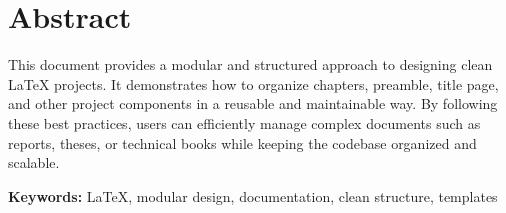 \chapter*{Abstract}

\thispagestyle{plain}
\vspace{1cm}

This document provides a modular and structured approach to designing clean \LaTeX{} projects. 
It demonstrates how to organize chapters, preamble, title page, and other project components in a reusable and maintainable way. 
By following these best practices, users can efficiently manage complex documents such as reports, theses, or technical books while keeping the codebase organized and scalable.

\vfill
\textbf{Keywords:} \LaTeX{}, modular design, documentation, clean structure, templates
